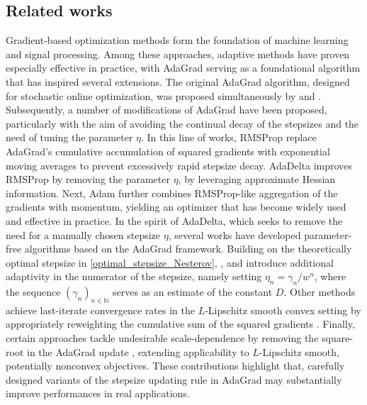 \documentclass[11pt]{article}
\theoremstyle{plain}
\theoremstyle{definition}
\theoremstyle{remark}
\newcommand{\w}{w}
\newcommand{\iter}{n}
\newcommand{\N}{\mathbb{N}}
\begin{document}
\subsection{Related works}
Gradient-based optimization methods form the foundation of machine learning and signal processing. Among these approaches, adaptive methods have proven especially effective in practice, with AdaGrad serving as a foundational algorithm that has inspired several extensions. The original AdaGrad algorithm, designed for stochastic online optimization, was proposed simultaneously by \cite{duchi2011adaptive} and \cite{streeter2010less}.\\

\noindent
Subsequently, a number of modifications of AdaGrad have been proposed, particularly with the aim of avoiding the continual decay of the stepsizes and the need of tuning the parameter $\eta$.
In this line of works, RMSProp \cite{hinton} replace AdaGrad’s cumulative accumulation of squared gradients with exponential moving averages to prevent excessively rapid stepsize decay.
AdaDelta \cite{zeiler2012adadelta} improves RMSProp by removing the parameter $\eta$, by leveraging approximate Hessian information.  Next, Adam \cite{kingma2014adam} further combines RMSProp-like aggregation of the gradients with momentum, yielding an optimizer that has become widely used and effective in practice. 
In the spirit of AdaDelta, which seeks to remove the need for a manually chosen stepsize $\eta$, several works have developed parameter-free algorithms based on the AdaGrad framework. Building on the theoretically optimal stepsize in \eqref{optimal_stepsize_Nesterov}, \citet{ivgi2023dog}, and \citet{defazio2023learning} introduce additional adaptivity in the numerator of the stepsize, namely setting $\eta_\iter = \gamma_\iter/\w^\iter$, where the sequence $(\gamma_\iter)_{\iter\in\N}$ serves as an estimate of the constant $D$. 
Other methods achieve last-iterate convergence rates in the $L$-Lipschitz smooth convex setting by appropriately reweighting the cumulative sum of the squared gradients \cite{liu2022convergence}. 
Finally, certain approaches tackle undesirable scale-dependence by removing the square-root in the AdaGrad update \cite{choudhury2024remove}, extending applicability to $L$-Lipschitz smooth, potentially nonconvex objectives. These contributions highlight that, 
carefully designed variants of the stepsize updating rule in AdaGrad may substantially improve performances in real applications.\\
\end{document}
